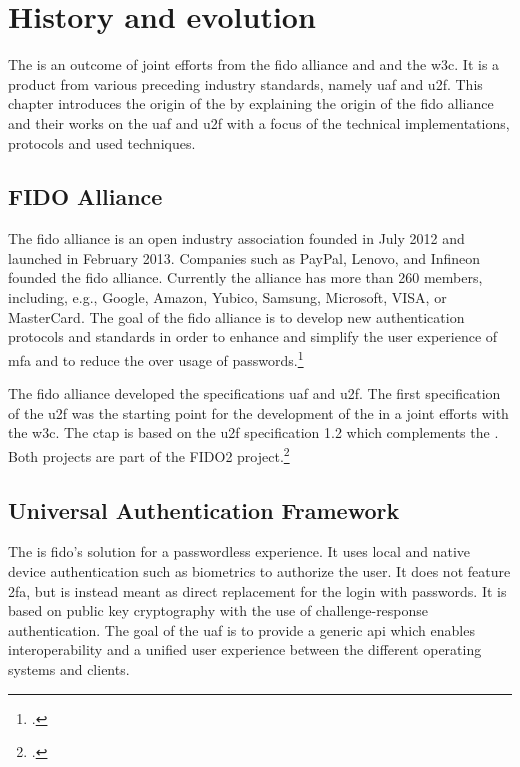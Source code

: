 
\section{History and evolution}

The \wa{} is an outcome of joint efforts from the \gls{fido} alliance and and the \gls{w3c}. It is a product from various preceding industry standards, namely \gls{uaf} and \gls{u2f}. This chapter introduces the origin of the \wa{} by explaining the origin of the \gls{fido} alliance and their works on the \gls{uaf} and \gls{u2f} with a focus of the technical implementations, protocols and used techniques.

\subsection{FIDO Alliance}

The \gls{fido} alliance is an open industry association founded in July 2012 and launched in February 2013. Companies such as PayPal, Lenovo, and Infineon founded the \gls{fido} alliance. Currently the alliance has more than 260 members, including, e.g., Google, Amazon, Yubico, Samsung, Microsoft, VISA, or MasterCard. The goal of the \gls{fido} alliance is to develop new authentication protocols and standards in order to enhance and simplify the user experience of \gls{mfa} and to reduce the over usage of passwords.\footcites[See][583]{eckert-it-sec-9}

The \gls{fido} alliance developed the specifications \gls{uaf} and \gls{u2f}. The first specification of the \gls{u2f} was the starting point for the development of the \wa{} in a joint efforts with the \gls{w3c}. The \gls{ctap} is based on the \gls{u2f} specification 1.2 which complements the \wa. Both projects are part of the FIDO2 project.\footcite[See][169--170]{grimes2017hacking}

\subsection{Universal Authentication Framework}

The  is \gls{fido}'s solution for a passwordless experience. It uses local and native device authentication such as biometrics to authorize the user. It does not feature \gls{2fa}, but is instead meant as direct replacement for the login with passwords. It is based on public key cryptography with the use of challenge-response authentication. The goal of the \gls{uaf} is to provide a generic \gls{api} which enables interoperability and a unified user experience between the different operating systems and clients.

